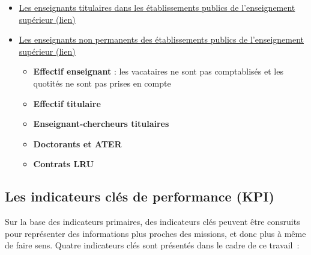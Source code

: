 \documentclass[12pt,french,landscape]{article}
\providecommand{\tightlist}{%
  \setlength{\itemsep}{0pt}\setlength{\parskip}{0pt}}
\begin{document}
\begin{multicols}{2}
\begin{itemize}
  \begin{itemize}
  \tightlist
  \item
    \textbf{Effectif étudiant} : Nombre d'étudiants inscrits
    (inscriptions principales) hors étudiants inscrits en parallèle en
    CPGE
  \item
    \textbf{Nombre d'inscriptions en Cycle 1 (L)} hors étudiants
    inscrits en parallèle en CPGE, inclu les DUT et autres formations
    post-bac
  \item
    \textbf{Nombre d'inscriptions en Cycle 2 (M)}
  \item
    \textbf{Nombre d'inscriptions en Cycle D (D)}
  \item
    \textbf{Nombre d'inscriptions en diplôme d'établissement} : par
    exemple diplôme d'université (DU)
  \end{itemize}
\item
  \href{https://data.enseignementsup-recherche.gouv.fr/explore/dataset/fr-esr-enseignants-titulaires-esr-public/}{Les
  enseignants titulaires dans les établissements publics de
  l'enseignement supérieur (lien)}
\item
  \href{https://data.enseignementsup-recherche.gouv.fr/explore/dataset/fr-esr-enseignants-nonpermanents-esr-public/}{Les
  enseignants non permanents des établissements publics de
  l'enseignement supérieur (lien)}

  \begin{itemize}
  \tightlist
  \item
    \textbf{Effectif enseignant} : les vacataires ne sont pas
    comptablisés et les quotités ne sont pas prises en compte
  \item
    \textbf{Effectif titulaire}
  \item
    \textbf{Enseignant-chercheurs titulaires}
  \item
    \textbf{Doctorants et ATER}
  \item
    \textbf{Contrats LRU}
  \end{itemize}
\end{itemize}

\hypertarget{les-indicateurs-cluxe9s-de-performance-kpi}{%
\subsection{Les indicateurs clés de performance
(KPI)}\label{les-indicateurs-cluxe9s-de-performance-kpi}}

Sur la base des indicateurs primaires, des indicateurs clés peuvent être
consruits pour représenter des informations plus proches des missions,
et donc plus à même de faire sens. Quatre indicateurs clés sont
présentés dans le cadre de ce travail~:


\end{multicols}
\end{document}
